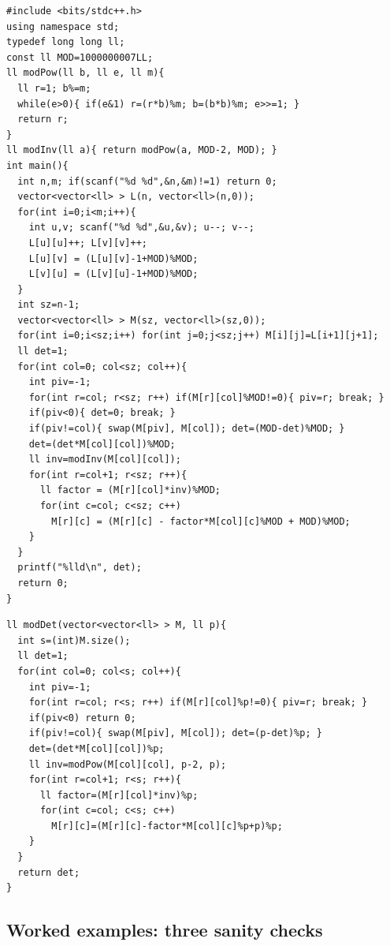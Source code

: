 \begin{lstlisting}[caption={Build the Laplacian of a graph on n vertices with m edges, then delete row and column 0 (equivalent to any other by the theorem). Modular Gaussian elimination evaluates the determinant. ASCII only, identifiers without underscores}, label={lst:c32-lap}]
#include <bits/stdc++.h>
using namespace std;
typedef long long ll;
const ll MOD=1000000007LL;
ll modPow(ll b, ll e, ll m){
  ll r=1; b%=m;
  while(e>0){ if(e&1) r=(r*b)%m; b=(b*b)%m; e>>=1; }
  return r;
}
ll modInv(ll a){ return modPow(a, MOD-2, MOD); }
int main(){
  int n,m; if(scanf("%d %d",&n,&m)!=1) return 0;
  vector<vector<ll> > L(n, vector<ll>(n,0));
  for(int i=0;i<m;i++){
    int u,v; scanf("%d %d",&u,&v); u--; v--;
    L[u][u]++; L[v][v]++;
    L[u][v] = (L[u][v]-1+MOD)%MOD;
    L[v][u] = (L[v][u]-1+MOD)%MOD;
  }
  int sz=n-1;
  vector<vector<ll> > M(sz, vector<ll>(sz,0));
  for(int i=0;i<sz;i++) for(int j=0;j<sz;j++) M[i][j]=L[i+1][j+1];
  ll det=1;
  for(int col=0; col<sz; col++){
    int piv=-1;
    for(int r=col; r<sz; r++) if(M[r][col]%MOD!=0){ piv=r; break; }
    if(piv<0){ det=0; break; }
    if(piv!=col){ swap(M[piv], M[col]); det=(MOD-det)%MOD; }
    det=(det*M[col][col])%MOD;
    ll inv=modInv(M[col][col]);
    for(int r=col+1; r<sz; r++){
      ll factor = (M[r][col]*inv)%MOD;
      for(int c=col; c<sz; c++)
        M[r][c] = (M[r][c] - factor*M[col][c]%MOD + MOD)%MOD;
    }
  }
  printf("%lld\n", det);
  return 0;
}
\end{lstlisting}

\begin{lstlisting}[caption={Standalone modular determinant of an \(s\times s\) matrix under a prime \(p\), used repeatedly when the same Laplacian is queried for different minors. Gaussian elimination with row swap and multiplicative pivots; \(\bigO{s^3}\)}, label={lst:c32-moddet}]
ll modDet(vector<vector<ll> > M, ll p){
  int s=(int)M.size();
  ll det=1;
  for(int col=0; col<s; col++){
    int piv=-1;
    for(int r=col; r<s; r++) if(M[r][col]%p!=0){ piv=r; break; }
    if(piv<0) return 0;
    if(piv!=col){ swap(M[piv], M[col]); det=(p-det)%p; }
    det=(det*M[col][col])%p;
    ll inv=modPow(M[col][col], p-2, p);
    for(int r=col+1; r<s; r++){
      ll factor=(M[r][col]*inv)%p;
      for(int c=col; c<s; c++)
        M[r][c]=(M[r][c]-factor*M[col][c]%p+p)%p;
    }
  }
  return det;
}
\end{lstlisting}

\subsection{Worked examples: three sanity checks}

